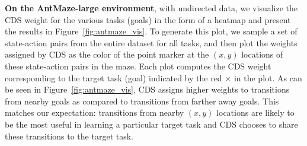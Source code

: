 {\textbf{On the AntMaze-large environment}, with undirected data, we visualize the CDS weight for the various tasks (goals) in the form of a heatmap and present the results in Figure~\ref{fig:antmaze_vis}. To generate this plot, we sample a set of state-action pairs from the entire dataset for all tasks, and then plot the weights assigned by CDS as the color of the point marker at the $(x, y)$ locations of these state-action pairs in the maze. Each plot computes the CDS weight corresponding to the target task (goal) indicated by the red $\times$ in the plot. As can be seen in Figure~\ref{fig:antmaze_vis}, CDS assigns higher weights to transitions from nearby goals as compared to transitions from farther away goals. This matches our expectation: transitions from nearby $(x, y)$ locations are likely to be the most useful in learning a particular target task and CDS chooses to share these transitions to the target task.}



